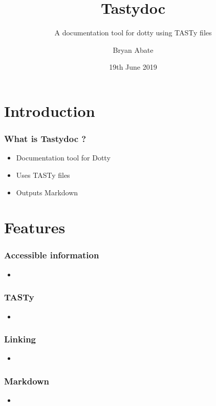 \documentclass{beamer}
\title{Tastydoc}
\subtitle{A documentation tool for dotty using TASTy files}
\author{Bryan Abate}
\date{19th June 2019}
\begin{document}
 
\frame{\titlepage}


\section{Introduction}

\begin{frame}
\frametitle{What is Tastydoc ?}
\begin{itemize}
  \item Documentation tool for Dotty \pause
  \item Uses TASTy files \pause
  \item Outputs Markdown
\end{itemize}
\end{frame}
 
\section{Features}

\begin{frame}
  \frametitle{Accessible information}
  \begin{itemize}
    \item
  \end{itemize}
\end{frame}

\begin{frame}
  \frametitle{TASTy}
  \begin{itemize}
    \item
  \end{itemize}
\end{frame}

\begin{frame}
  \frametitle{Linking}
  \begin{itemize}
    \item
  \end{itemize}
\end{frame}

\begin{frame}
  \frametitle{Markdown}
  \begin{itemize}
    \item
  \end{itemize}
\end{frame}
\end{document}
